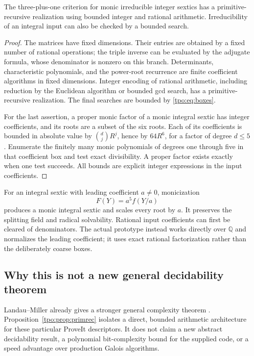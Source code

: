 \documentclass[11pt,letterpaper]{article}
\numberwithin{equation}{section}
\theoremstyle{definition}
\theoremstyle{remark}
\newcommand{\QQ}{\mathbb Q}
\begin{document}
\begin{proposition}
\label{tpo:prop:primrec}
The three-plus-one criterion for monic irreducible integer sextics has a
primitive-recursive realization using bounded integer and rational arithmetic.
Irreducibility of an integral input can also be checked by a bounded search.
\end{proposition}
\begin{proof}
The matrices have fixed dimensions. Their entries are obtained by a fixed
number of rational operations; the triple inverse can be evaluated by the
adjugate formula, whose denominator is nonzero on this branch. Determinants,
characteristic polynomials, and the power-root recurrence are finite
coefficient algorithms in fixed dimensions. Integer encoding of rational
arithmetic, including reduction by the Euclidean algorithm or bounded gcd
search, has a primitive-recursive realization. The final searches are bounded
by \eqref{tpo:eq:boxes}.

For the last assertion, a proper monic factor of a monic integral sextic has
integer coefficients, and its roots are a subset of the six roots. Each of
its coefficients is bounded in absolute value by $\binom{d}{j}R^j$, hence by
$64R^6$, for a factor of degree $d\le5$. Enumerate the finitely many monic
polynomials of degrees one through five in that coefficient box and test
exact divisibility. A proper factor exists exactly when one test succeeds.
All bounds are explicit integer expressions in the input coefficients.
\end{proof}

For an integral sextic with leading coefficient $a\ne0$, monicization
\[
 F(Y)=a^5 f(Y/a)
\]
produces a monic integral sextic and scales every root by $a$. It preserves
the splitting field and radical solvability. Rational input coefficients can
first be cleared of denominators. The actual prototype instead works directly
over $\QQ$ and normalizes the leading coefficient; it uses exact rational
factorization rather than the deliberately coarse boxes.

\subsection{Why this is not a new general decidability theorem}
Landau--Miller already gives a stronger general complexity theorem
\cite{landau-miller}. Proposition~\ref{tpo:prop:primrec} isolates a direct, bounded
arithmetic architecture for these particular ProveIt descriptors. It does not
claim a new abstract decidability result, a polynomial bit-complexity bound for
the supplied code, or a speed advantage over production Galois algorithms.
\end{document}
